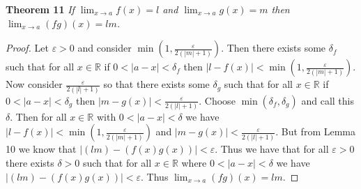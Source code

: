 \documentclass{article}
\begin{document}
\begin{flushleft}
\textbf{Theorem 11}
\textsl{If $\lim_{x \rightarrow a} f(x) = l$ and $\lim_{x \rightarrow a} g(x) = m$ then $\lim_{x \rightarrow a} (fg)(x) = lm$.}
\begin{proof}
Let $\varepsilon > 0$ and consider $\min \left(1, \frac{\varepsilon}{2 (|m| + 1)} \right)$. Then there exists some $\delta_f$ such that for all $x \in \mathbb{R}$ if $0 < |a - x| < \delta_f$ then $|l - f(x)| < \min \left(1, \frac{\varepsilon}{2 (|m| + 1)} \right)$. Now consider $\frac{\varepsilon}{2 (|l| + 1)}$ so that there exists some $\delta_g$ such that for all $x \in \mathbb{R}$ if $0 < |a - x| < \delta_g$ then $|m - g(x)| < \frac{\varepsilon}{2 (|l| + 1)}$. Choose $\min (\delta_f, \delta_g)$ and call this $\delta$. Then for all $x \in \mathbb{R}$ with $0 < |a-x| < \delta$ we have $|l - f(x)| < \min \left(1, \frac{\varepsilon}{2 (|m| + 1)} \right)$ and $|m - g(x)| < \frac{\varepsilon}{2 (|l| + 1)}$. But from Lemma 10 we know that $|(lm)-(f(x)g(x))| < \varepsilon$. Thus we have that for all $\varepsilon > 0$ there exists $\delta > 0$ such that for all $x \in \mathbb{R}$ where $0 < |a-x| < \delta$ we have $|(lm)-(f(x)g(x))| < \varepsilon$. Thus $\lim_{x \rightarrow a} (fg)(x) = lm$.
\end{proof}


\end{flushleft}
\end{document}
